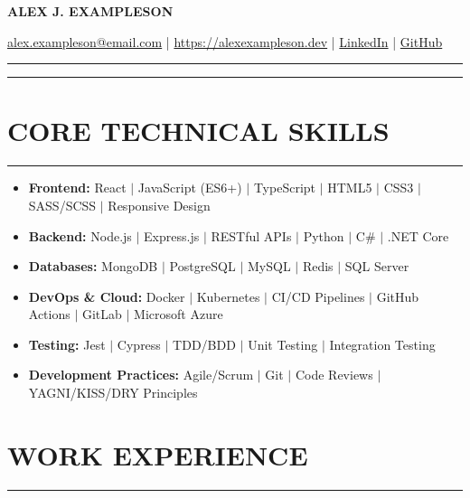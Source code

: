 \documentclass[a4paper,10pt]{article}
\begin{document}
    \begin{center}
        \textbf{\Large ALEX J. EXAMPLESON}
    \end{center}
    
    \begin{center}
        \href{mailto:alex.exampleson@email.com}{alex.exampleson@email.com} | \href{https://alexexampleson.dev}{https://alexexampleson.dev} | \href{https://linkedin.com/in/alexjexampleson}{LinkedIn} | \href{https://github.com/alexjexampleson}{GitHub}
    \end{center}

    \hrule
    \vspace{0.1cm}
    \hrule
    \vspace{0.2cm}

    \section*{CORE TECHNICAL SKILLS}
    \vspace{-0.8em}
    \hrule
    \vspace{0.2cm}
    \begin{itemize}[leftmargin=0.2cm, itemsep=0pt, label=--]
        \item \textbf{Frontend:} React $|$ JavaScript (ES6+) $|$ TypeScript $|$ HTML5 $|$ CSS3 $|$ SASS/SCSS $|$ Responsive Design
        \item \textbf{Backend:} Node.js $|$ Express.js $|$ RESTful APIs $|$ Python $|$ C\# $|$ .NET Core
        \item \textbf{Databases:} MongoDB $|$ PostgreSQL $|$ MySQL $|$ Redis $|$ SQL Server
        \item \textbf{DevOps \& Cloud:} Docker $|$ Kubernetes $|$ CI/CD Pipelines $|$ GitHub Actions $|$ GitLab $|$ Microsoft Azure
        \item \textbf{Testing:} Jest $|$ Cypress $|$ TDD/BDD $|$ Unit Testing $|$ Integration Testing
        \item \textbf{Development Practices:} Agile/Scrum $|$ Git $|$ Code Reviews $|$ YAGNI/KISS/DRY Principles
    \end{itemize}

    \section*{WORK EXPERIENCE}
    \vspace{-0.8em}
    \hrule
    \vspace{0.2cm}
\end{document}
